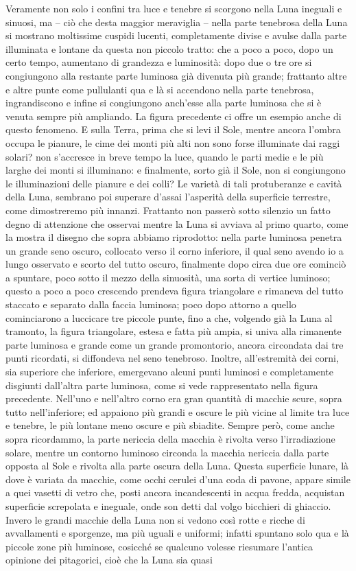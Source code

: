 \documentclass[11pt,twoside,openany]{book}
\begin{document}
Veramente non solo i confini tra luce e tenebre si scorgono nella Luna ineguali e sinuosi, ma – ciò che desta maggior meraviglia – nella parte tenebrosa della Luna si mostrano moltissime cuspidi lucenti, completamente divise e avulse dalla parte illuminata e lontane da questa non piccolo tratto: che a poco a poco, dopo un certo tempo, aumentano di grandezza e luminosità: dopo due o tre ore si congiungono alla restante parte luminosa già divenuta più grande; frattanto altre e altre punte come pullulanti qua e là si accendono nella parte tenebrosa, ingrandiscono e infine si congiungono anch'esse alla parte luminosa che si è venuta sempre più ampliando. La figura precedente ci offre un esempio anche di questo fenomeno. E sulla Terra, prima che si levi il Sole, mentre ancora l'ombra occupa le pianure, le cime dei monti più alti non sono forse illuminate dai raggi solari? non s'accresce in breve tempo la luce, quando le parti medie e le più larghe dei monti si illuminano: e finalmente, sorto già il Sole, non si congiungono le illuminazioni delle pianure e dei colli? Le varietà di tali protuberanze e cavità della Luna, sembrano poi superare d'assai l'asperità della superficie terrestre, come dimostreremo più innanzi. Frattanto non passerò sotto silenzio un fatto degno di attenzione che osservai mentre la Luna si avviava al primo quarto, come la mostra il disegno che sopra abbiamo riprodotto: nella parte luminosa penetra un grande seno oscuro, collocato verso il corno inferiore, il qual seno avendo io a lungo osservato e scorto del tutto oscuro, finalmente dopo circa due ore cominciò a spuntare, poco sotto il mezzo della sinuosità, una sorta di vertice luminoso; questo a poco a poco crescendo prendeva figura triangolare e rimaneva del tutto staccato e separato dalla faccia luminosa; poco dopo attorno a quello cominciarono a luccicare tre piccole punte, fino a che, volgendo già la Luna al tramonto, la figura triangolare, estesa e fatta più ampia, si univa alla rimanente parte luminosa e grande come un grande promontorio, ancora circondata dai tre punti ricordati, si diffondeva nel seno tenebroso. Inoltre, all'estremità dei corni, sia superiore che inferiore, emergevano alcuni punti luminosi e completamente disgiunti dall'altra parte luminosa, come si vede rappresentato nella figura precedente. Nell'uno e nell'altro corno era gran quantità di macchie scure, sopra tutto nell'inferiore; ed appaiono più grandi e oscure le più vicine al limite tra luce e tenebre, le più lontane meno oscure e più sbiadite. Sempre però, come anche sopra ricordammo, la parte nericcia della macchia è rivolta verso l'irradiazione solare, mentre un contorno luminoso circonda la macchia nericcia dalla parte opposta al Sole e rivolta alla parte oscura della Luna. Questa superficie lunare, là dove è variata da macchie, come occhi cerulei d'una coda di pavone, appare simile a quei vasetti di vetro che, posti ancora incandescenti in acqua fredda, acquistan superficie screpolata e ineguale, onde son detti dal volgo bicchieri di ghiaccio. Invero le grandi macchie della Luna non si vedono così rotte e ricche di avvallamenti e sporgenze, ma più uguali e uniformi; infatti spuntano solo qua e là piccole zone più luminose, cosicché se qualcuno volesse riesumare l'antica opinione dei pitagorici, cioè che la Luna sia quasi 
\end{document}
